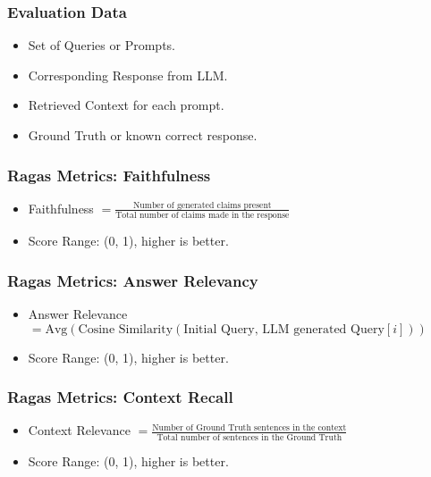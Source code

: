 \begin{frame}[fragile]
\frametitle{Evaluation Data}
\begin{itemize}
    \item Set of Queries or Prompts.
    \item Corresponding Response from LLM.
    \item Retrieved Context for each prompt.
    \item Ground Truth or known correct response.
\end{itemize}
\end{frame}

\begin{frame}[fragile]
\frametitle{Ragas Metrics: Faithfulness}
\begin{itemize}
    \item Faithfulness $= \frac{\text{Number of generated claims present}}{\text{Total number of claims made in the response}}$
    \item Score Range: (0, 1), higher is better.
\end{itemize}
\end{frame}

\begin{frame}[fragile]
\frametitle{Ragas Metrics: Answer Relevancy}
\begin{itemize}
    \item Answer Relevance $= \text{Avg}(\text{Cosine Similarity}(\text{Initial Query, LLM generated Query}[i]))$
    \item Score Range: (0, 1), higher is better.
\end{itemize}
\end{frame}

\begin{frame}[fragile]
\frametitle{Ragas Metrics: Context Recall}
\begin{itemize}
    \item Context Relevance $= \frac{\text{Number of Ground Truth sentences in the context}}{\text{Total number of sentences in the Ground Truth}}$
    \item Score Range: (0, 1), higher is better.
\end{itemize}
\end{frame}

